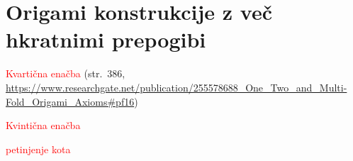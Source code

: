 \section{Origami konstrukcije z več hkratnimi prepogibi}

\textcolor{red}{Kvartična enačba} (str.\ 386, \url{https://www.researchgate.net/publication/255578688_One_Two_and_Multi-Fold_Origami_Axioms#pf16})

\textcolor{red}{Kvintična enačba}

\textcolor{red}{petinjenje kota}